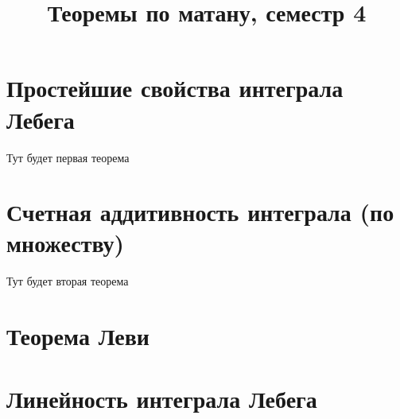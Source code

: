 \documentclass[paper=a4, fontsize=11pt]{article}
\title{Теоремы по матану, семестр 4}
\begin{document}
\maketitle
\tableofcontents
\newpage

\section{Простейшие свойства интеграла Лебега}
Тут будет первая теорема

\section{Счетная аддитивность интеграла (по множеству)}
Тут будет вторая теорема

\section{Теорема Леви}

\section{Линейность интеграла Лебега}
\end{document}
